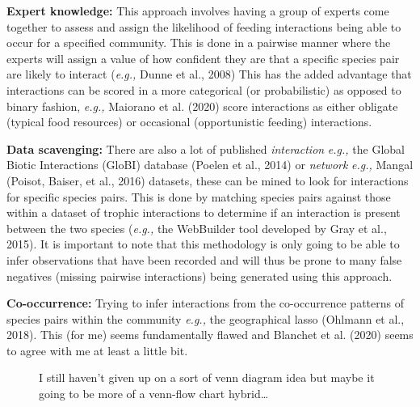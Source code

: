 \documentclass[
]{article}
\begin{document}
\textbf{Expert knowledge:} This approach involves having a group of
experts come together to assess and assign the likelihood of feeding
interactions being able to occur for a specified community. This is done
in a pairwise manner where the experts will assign a value of how
confident they are that a specific species pair are likely to interact
(\emph{e.g.,} Dunne et al., 2008) This has the added advantage that
interactions can be scored in a more categorical (or probabilistic) as
opposed to binary fashion, \emph{e.g.,} Maiorano et al. (2020) score
interactions as either obligate (typical food resources) or occasional
(opportunistic feeding) interactions.

\textbf{Data scavenging:} There are also a lot of published
\emph{interaction} \emph{e.g.,} the Global Biotic Interactions (GloBI)
database (Poelen et al., 2014) or \emph{network} \emph{e.g.,} Mangal
(Poisot, Baiser, et al., 2016) datasets, these can be mined to look for
interactions for specific species pairs. This is done by matching
species pairs against those within a dataset of trophic interactions to
determine if an interaction is present between the two species
(\emph{e.g.,} the WebBuilder tool developed by Gray et al., 2015). It is
important to note that this methodology is only going to be able to
infer observations that have been recorded and will thus be prone to
many false negatives (missing pairwise interactions) being generated
using this approach.

\textbf{Co-occurrence:} Trying to infer interactions from the
co-occurrence patterns of species pairs within the community
\emph{e.g.,} the geographical lasso (Ohlmann et al., 2018). This (for
me) seems fundamentally flawed and Blanchet et al. (2020) seems to agree
with me at least a little bit.

\begin{figure}


\caption{\label{fig-venn}I still haven't given up on a sort of venn
diagram idea but maybe it going to be more of a venn-flow chart
hybrid\ldots{}}

\end{figure}%
\end{document}

